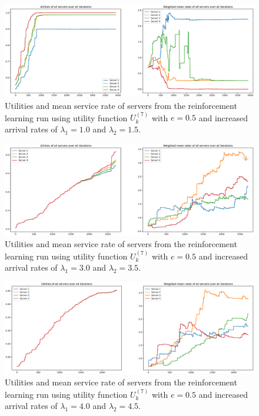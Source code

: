 \begin{figure}[H]
    \includegraphics[width=\textwidth]{chapters/00_appendix/03_more_rl_results/Bin/utility_7_eps/u7_4_e05_Lambda_25.eps}
    \caption{Utilities and mean service rate of servers from the reinforcement
    learning run using utility function \(U_k^{(7)}\) with \(e = 0.5\) and
    increased arrival rates of \(\lambda_1 = 1.0\) and \(\lambda_2 = 1.5\).}
    \label{fig:RL_utility7_4_e05_Lambda_25}
\end{figure}


\begin{figure}[H]
    \includegraphics[width=\textwidth]{chapters/00_appendix/03_more_rl_results/Bin/utility_7_eps/u7_4_e05_Lambda_65.eps}
    \caption{Utilities and mean service rate of servers from the reinforcement
    learning run using utility function \(U_k^{(7)}\) with \(e = 0.5\) and
    increased arrival rates of \(\lambda_1 = 3.0\) and \(\lambda_2 = 3.5\).}
    \label{fig:RL_utility7_4_e05_Lambda_65}
\end{figure}


\begin{figure}[H]
    \includegraphics[width=\textwidth]{chapters/00_appendix/03_more_rl_results/Bin/utility_7_eps/u7_4_e05_Lambda_85.eps}
    \caption{Utilities and mean service rate of servers from the reinforcement
    learning run using utility function \(U_k^{(7)}\) with \(e = 0.5\) and
    increased arrival rates of \(\lambda_1 = 4.0\) and \(\lambda_2 = 4.5\).}
    \label{fig:RL_utility7_4_e05_Lambda_85}
\end{figure}


